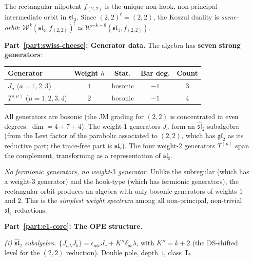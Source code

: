 \begin{computation}
\label{comp:ordered-bar-sl4-rect}

The rectangular nilpotent $f_{(2,2)}$ is the unique
non-hook, non-principal intermediate orbit in
$\mathfrak{sl}_4$. Since $(2,2)^t = (2,2)$, the
Koszul duality is \emph{same-orbit}:
$\mathcal W^k(\mathfrak{sl}_4, f_{(2,2)})^!
\simeq \mathcal W^{-k-8}(\mathfrak{sl}_4, f_{(2,2)})$.

\medskip
\noindent\textbf{Part~\ref{part:swiss-cheese}: Generator data.}
The algebra has \textbf{seven strong generators}:
\begin{center}
\renewcommand{\arraystretch}{1.15}
\begin{tabular}{lcccc}
\textbf{Generator} & \textbf{Weight $h$} &
 \textbf{Stat.} & \textbf{Bar deg.} &
 \textbf{Count} \\
\hline
$J_a$ ($a=1,2,3$) & $1$ & bosonic & $-1$ & $3$ \\
$T^{(\mu)}$ ($\mu=1,2,3,4$) & $2$ & bosonic & $-1$
 & $4$
\end{tabular}
\end{center}
All generators are bosonic (the JM grading for $(2,2)$
is concentrated in even degrees: $\dim = 4+7+4$). The
weight-$1$ generators $J_a$ form an
$\widehat{\mathfrak{sl}}_2$ subalgebra (from the Levi
factor of the parabolic associated to $(2,2)$, which has
$\mathfrak{gl}_2$ as its reductive part; the trace-free
part is $\mathfrak{sl}_2$). The four weight-$2$
generators $T^{(\mu)}$ span the complement, transforming
as a representation of $\mathfrak{sl}_2$.

\emph{No fermionic generators, no weight-$3$ generator.}
Unlike the subregular (which has a weight-$3$ generator)
and the hook-type (which has fermionic generators),
the rectangular orbit produces an algebra with only
bosonic generators of weights $1$ and $2$. This is the
\emph{simplest weight spectrum} among all non-principal,
non-trivial $\mathfrak{sl}_4$ reductions.

\medskip
\noindent\textbf{Part~\ref{part:e1-core}: The OPE structure.}

\smallskip
\noindent\emph{(i) $\widehat{\mathfrak{sl}}_2$ subalgebra.}
$\{J_a{}_\lambda J_b\} = \epsilon_{abc}J_c + K''\delta_{ab}\lambda$,
with $K'' = k + 2$ (the DS-shifted level for the $(2,2)$
reduction). Double pole, depth $1$,
class~$\mathbf{L}$.


\end{computation}
